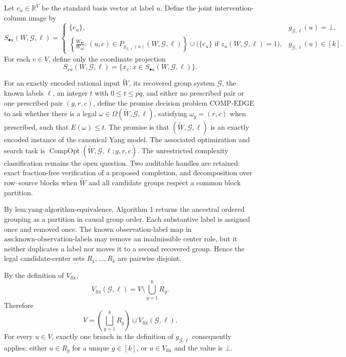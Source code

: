 Let \(e_u\in\mathbb R^V\) be the standard basis vector at label \(u\).  Define the joint intervention-column image by
\[
S_{\bullet u}(W,\mathcal G,\ell)=
\begin{cases}
\{e_u\},&g_{\mathcal G,\ell}(u)=\bot,\\
\displaystyle
\left\{\frac{W_{\bullet c}}{W_{uc}}:(u,c)\in
P_{g_{\mathcal G,\ell}(u)}(W,\mathcal G,\ell)\right\}
\cup
\bigl(\{e_u\}\text{ if }z_u(W,\mathcal G,\ell)=1\bigr),
&g_{\mathcal G,\ell}(u)\in[k].
\end{cases}
\]
For each \(v\in V\), define only the coordinate projection
\[
S_{vu}(W,\mathcal G,\ell)
=\{x_v:x\in S_{\bullet u}(W,\mathcal G,\ell)\}.
\]

For an exactly encoded rational input \(\widetilde W\), its recovered group system \(\mathcal G\), the known labels \(\ell\), an integer \(t\) with \(0\le t\le pq\), and either no prescribed pair or one prescribed pair \((g,r,c)\), define the promise decision problem \(\mathrm{COMP\text{-}EDGE}\) to ask whether there is a legal \(\omega\in\Omega(\widetilde W,\mathcal G,\ell)\), satisfying \(\omega_g=(r,c)\) when prescribed, such that \(E(\omega)\le t\).  The promise is that \((\widetilde W,\mathcal G,\ell)\) is an exactly encoded instance of the canonical Yang model.  The associated optimization and search task is \(\operatorname{CompOpt}(\widetilde W,\mathcal G,\ell;g,r,c)\).  The unrestricted complexity classification remains the open question.  Two auditable handles are retained: exact fraction-free verification of a proposed completion, and decomposition over row--source blocks when \(\widetilde W\) and all candidate groups respect a common block partition.

By \(\text{lem:yang-algorithm-equivalence}\), Algorithm 1 returns the ancestral ordered grouping as a partition in causal group order.  Each substantive label is assigned once and removed once.  The known observation-label map in \(\text{ass:known-observation-labels}\) may remove an inadmissible center role, but it neither duplicates a label nor moves it to a second recovered group.  Hence the legal candidate-center sets \(R_1,\ldots,R_k\) are pairwise disjoint.

By the definition of \(V_{\mathrm{fix}}\),
\[
V_{\mathrm{fix}}(\mathcal G,\ell)
=V\setminus\bigcup_{g=1}^kR_g.
\]
Therefore
\[
V=\left(\bigsqcup_{g=1}^kR_g\right)
\sqcup V_{\mathrm{fix}}(\mathcal G,\ell).
\]
For every \(u\in V\), exactly one branch in the definition of \(g_{\mathcal G,\ell}\) consequently applies: either \(u\in R_g\) for a unique \(g\in[k]\), or \(u\in V_{\mathrm{fix}}\) and the value is \(\bot\).

